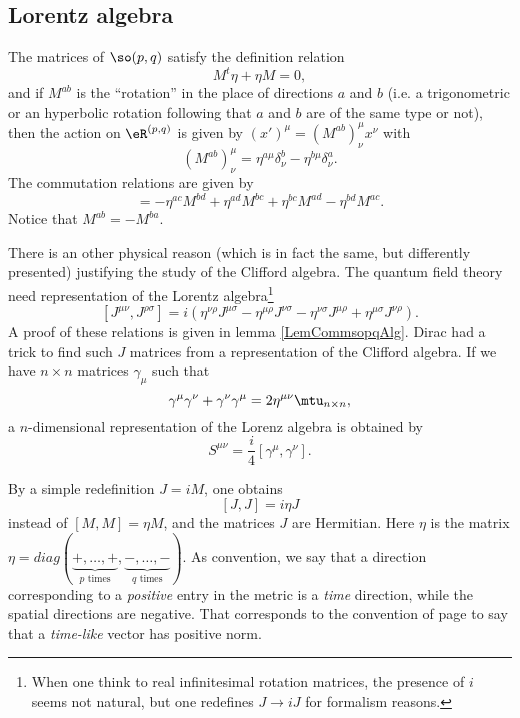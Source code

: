 \subsection{Lorentz algebra}

\begin{lemma}     \label{LemCommsopqAlg}
The matrices of $\so(p,q)$ satisfy the definition relation
\begin{equation}
    M^t\eta+\eta M=0,
\end{equation}
and if $M^{ab}$ is the ``rotation'' in the place of directions $a$ and $b$ (i.e. a trigonometric or an hyperbolic rotation following that $a$ and $b$ are of the same type or not), then the action on $\eR^{(p,q)}$ is given by $(x')^{\mu}=(M^{ab})^{\mu}_{\nu}x^{\nu}$ with
\begin{equation}
    (M^{ab})^{\mu}_{\nu}=\eta^{a\mu}\delta^b_{\nu}-\eta^{b\mu}\delta^a_{\nu}.
\end{equation}
The commutation relations are given by
\begin{equation}
    [M^{ab},M^{cd}]=-\eta^{ac}M^{bd}+\eta^{ad}M^{bc}+\eta^{bc}M^{ad}-\eta^{bd}M^{ac}.
\end{equation}
Notice that $M^{ab}=-M^{ba}$. 
\end{lemma}

There is an other physical reason (which is in fact the same, but differently presented) justifying the study of the Clifford algebra. The quantum field theory need representation of the Lorentz algebra\footnote{When one think to real infinitesimal rotation matrices, the presence of $i$ seems not natural, but one redefines $J\to iJ$ for formalism reasons.}
\[
 [J^{\mu\nu},J^{\rho\sigma}]=i(\eta^{\nu\rho}J^{\mu\sigma}-\eta^{\mu\rho}J^{\nu\sigma}
 -\eta^{\nu\sigma}J^{\mu\rho}+\eta^{\mu\sigma}J^{\nu\rho}).
\]
A proof of these relations is given in lemma \ref{LemCommsopqAlg}. Dirac had a trick to find such $J$ matrices from a representation of the Clifford algebra. If we have $n\times n$ matrices $\gamma_{\mu}$ such that
\[
    \gamma^{\mu}\gamma^{\nu}+\gamma^{\nu}\gamma^{\mu}=2\eta^{\mu\nu}\mtu_{n\times n},
\]
a $n$-dimensional representation of the Lorenz algebra is obtained by
\[
    S^{\mu\nu}=\frac{i}{4}\left[\gamma^{\mu},\gamma^{\nu}\right].
\]

By a simple redefinition $J=iM$, one obtains 
\begin{equation}            \label{EqJJietaJcomm}
    [J,J]=i\eta J
\end{equation}
instead of $[M,M]=\eta M$, and the matrices $J$ are Hermitian. Here $\eta$ is the matrix $\eta=diag(\underbrace{+,\ldots,+}_{\text{$p$ times}},\underbrace{-,\ldots,-}_{\text{$q$ times}})$. As convention, we say that a direction corresponding to a \emph{positive} entry in the metric is a \emph{time} direction, while the spatial directions are negative. That corresponds to the convention of page \pageref{PgDefsGenre} to say that a \emph{time-like} vector has positive norm.

